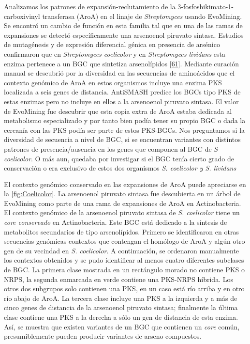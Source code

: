 \documentclass[12pt,twoside]{reedthesis}
\begin{document}
  Analizamos los patrones de expansión-reclutamiento de la
  3-fosfoshikimato-1-carboxivinyl transferasa (AroA) en el linaje de
  \emph{Streptomyces} usando EvoMining. Se encontró un cambio de función
  en esta familia tal que en una de las ramas de expansiones se detectó
  específicamente una arsenoenol piruvato sintasa. Estudios de mutagénesis
  y de expresión diferencial génica en presencia de arsénico confirmaron
  que en \emph{Streptomyces coelicolor} y en \emph{Streptomyces lividans}
  esta enzima pertenece a un BGC que sintetiza arsenolípidos
  {[}\protect\hyperlink{ref-cruz-morales_phylogenomic_2016}{61}{]}.
  Mediante curación manual se descubrió por la diversidad en las
  secuencias de aminoácidos que el contexto genómico de AroA en estos
  organismos incluye una enzima PKS localizada a seis genes de distancia.
  AntiSMASH predice los BGCs tipo PKS de estas enzimas pero no incluye en
  ellos a la arsenoenol piruvato sintasa. El valor de EvoMining fue
  descubrir que esta copia extra de AroA estaba dedicada al metabolismo
  especializado y por tanto bien podía tener su propio BGC o dada la
  cercanía con las PKS podía ser parte de estos PKS-BGCs. Nos preguntamos
  si la diversidad de secuencia a nivel de BGC, si se encuentran variantes
  con distintos patrones de presencia/ausencia en los genes que componen
  al BGC de \emph{S coelicolor}. O más aun, quedaba por investigar si el
  BGC tenía cierto grado de conservación o era exclusivo de estos dos
  organismos \emph{S. coelicolor y S. lividans}
  
  El contexto genómico conservado en las expansiones de AroA puede
  apreciarse en la \autoref{fig:Coelicolor}. La arsenoenol piruvato
  sintasa fue descubierta en un árbol de EvoMining como parte de una rama
  de expansiones de AroA en Actinobacteria. El contexto genómico de la
  arsenoenol piruvato sintasa de \emph{S. coelicolor } tiene un \emph{core
  conservado} en Actinobacteria. Este BGC está dedicado a la síntesis de
  metabolitos secundarios de tipo arsenolípidos. Primero se identificaron
  en otras secuencias genómicas contextos que contengan el homólogo de
  AroA y algún otro gen de su vecindad en \emph{S. coelicolor}. A
  continuación, se ordenaron manualmente los contextos obtenidos y se pudo
  identificar al menos cuatro diferentes subclases de BGC. La primera
  clase mostrada en un rectángulo morado no contiene PKS o NRPS, la
  segunda enmarcada en verde contiene una PKS-NRPS híbrida. Los otros dos
  subgrupos solo contienen una PKS, en un caso está río arriba y en otro
  río abajo de AroA. La tercera clase incluye una PKS a la izquierda y a
  más de cinco genes de distancia de la arsenoenol piruvato sintasa;
  finalmente la última clase contiene una PKS a la derecha a sólo un gen
  de distancia de esta enzima. Así, se muestra que existen variantes de un
  BGC que contienen un \emph{core} común, presumiblemente pueden producir
  variantes de arseno compuestos.
  
\end{document}
